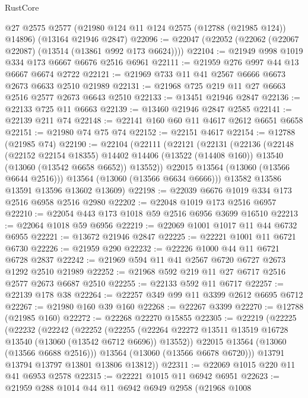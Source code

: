 \begin{lexlean}{RustCore}
\begin{coremodule}
    @27
    @2575
    @2577
    (@21980 @124 @11 @124 @2575 (@12788 (@21985 @124)) @14896)
    (@13164 @21946 @2847)
@22096 := @22047 (@22052 (@22062 (@22067 @22087) (@13514 (@13861 @992 @173 @6624))))
@22104 := @21949 @998 @1019 @334 @173 @6667 @6676 @2516 @6961
@22111 := @21959 @276 @997 @44 @13 @6667 @6674 @2722
@22121 := @21969 @733 @11 @41 @2567 @6666 @6673 @2673 @6633 @2510 @21989
@22131 := @21968 @725 @219 @11 @27 @6663 @2516 @2577 @2673 @6643 @2510
@22133 := @13451 @21946 @2847
@22136 := @22133 @725 @11 @6663
@22139 := @13460 @21946 @2847 @2585
@22141 := @22139 @211 @74
@22148 := @22141 @160 @60 @11 @4617 @2612 @6651 @6658
@22151 := @21980 @74 @75 @74
@22152 := @22151 @4617
@22154 := @12788 (@21985 @74)
@22190 := @22104
    (@22111
      (@22121
        (@22131
          (@22136
            (@22148
              (@22152 @22154 @18355)
              @14402
              @14406
              (@13522 (@14408 @160))
              @13540
              (@13060 (@13542 @6658 @6652))
              @13552))
          @22015
          @13564
          (@13060 (@13566 @6644 @2516)))
        @13564
        (@13060 (@13566 @6634 @6666)))
      @13582
      @13586
      @13591
      @13596
      @13602
      @13609)
@22198 := @22039 @6676 @1019 @334 @173 @2516 @6958 @2516 @2980
@22202 := @22048 @1019 @173 @2516 @6957
@22210 := @22054 @443 @173 @1018 @59 @2516 @6956 @3699 @16510
@22213 := @22064 @1018 @59 @6956
@22219 := @22069 @1001 @1017 @11 @44 @6732 @6955
@22221 := @13672 @21946 @2847
@22225 := @22221 @1001 @11 @6721 @6730
@22226 := @21959 @290
@22232 := @22226 @1000 @44 @11 @6721 @6728 @2837
@22242 := @21969 @594 @11 @41 @2567 @6720 @6727 @2673 @1292 @2510 @21989
@22252 := @21968 @592 @219 @11 @27 @6717 @2516 @2577 @2673 @6687 @2510
@22255 := @22133 @592 @11 @6717
@22257 := @22139 @178 @38
@22264 := @22257 @349 @99 @11 @3399 @2612 @6695 @6712
@22267 := @21980 @160 @39 @160
@22268 := @22267 @3399
@22270 := @12788 (@21985 @160)
@22272 := @22268 @22270 @15855
@22305 := @22219
    (@22225
      (@22232
        (@22242
          (@22252
            (@22255
              (@22264 @22272 @13511 @13519 @16728 @13540 (@13060 (@13542 @6712 @6696)) @13552))
            @22015
            @13564
            (@13060 (@13566 @6688 @2516)))
          @13564
          (@13060 (@13566 @6678 @6720)))
        @13791
        @13794
        @13797
        @13801
        @13806
        @13812))
@22311 := @22069 @1015 @220 @11 @41 @6953 @2578
@22315 := @22221 @1015 @11 @6942 @6951
@22623 := @21959
    @288
    @1014
    @44
    @11
    @6942
    @6949
    @2958
    (@21968
      @1008

\end{coremodule}
\end{lexlean}
